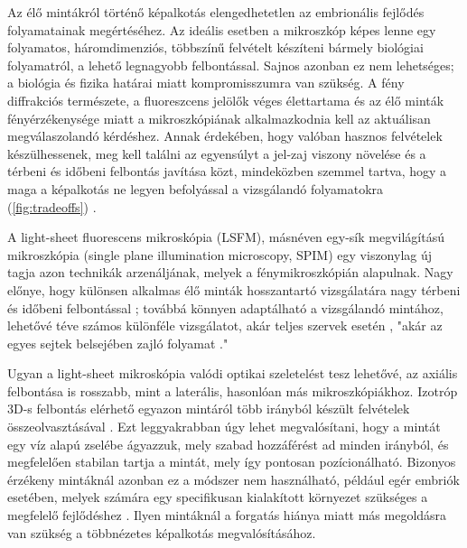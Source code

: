 \documentclass{booklet_style}
\begin{document}
Az élő mintákról történő képalkotás elengedhetetlen az embrionális fejlődés folyamatainak megértéséhez. Az ideális esetben a mikroszkóp képes lenne egy folyamatos, háromdimenziós, többszínű felvételt készíteni bármely biológiai folyamatról, a lehető legnagyobb felbontással. Sajnos azonban ez nem lehetséges; a biológia és fizika határai miatt kompromisszumra van szükség. A fény diffrakciós természete, a fluoreszcens jelölők véges élettartama és az élő minták fényérzékenysége miatt a mikroszkópiának alkalmazkodnia kell az aktuálisan megválaszolandó kérdéshez. Annak érdekében, hogy valóban hasznos felvételek készülhessenek, meg kell találni az egyensúlyt a jel-zaj viszony növelése és a térbeni és időbeni felbontás javítása közt, mindeközben szemmel tartva, hogy a maga a képalkotás ne legyen befolyással a vizsgálandó folyamatokra (\autoref{fig:tradeoffs}) \cite{laissue_assessing_2017}.

A light-sheet fluorescens mikroskópia (LSFM), másnéven egy-sík megvilágítású mikroszkópia (single plane illumination microscopy, SPIM) \cite{huisken_optical_2004} egy viszonylag új tagja azon technikák arzenáljának, melyek a fénymikroszkópián alapulnak. Nagy előnye, hogy különsen alkalmas élő minták hosszantartó vizsgálatára nagy térbeni és időbeni felbontással \cite{keller_quantitative_2008, huisken_selective_2009, weber_light_2011,tomer_shedding_2011}; továbbá könnyen adaptálható a vizsgálandó mintához, lehetővé téve számos különféle vizsgálatot, akár teljes szervek esetén \cite{dodt_ultramicroscopy:_2007}, "akár az egyes sejtek belsejében zajló folyamat \cite{chen_lattice_2014}."

Ugyan a light-sheet mikroskópia valódi optikai szeletelést tesz lehetővé, az axiális felbontása is rosszabb, mint a laterális, hasonlóan más mikroszkópiákhoz.
Izotróp 3D-s felbontás elérhető egyazon mintáról több irányból készült felvételek összeolvasztásával \cite{preibisch_efficient_2014}. Ezt leggyakrabban úgy lehet megvalósítani, hogy a mintát egy víz alapú zselébe ágyazzuk, mely szabad hozzáférést ad minden irányból, és megfelelően stabilan tartja a mintát, mely így pontosan pozícionálható. Bizonyos érzékeny mintáknál azonban ez a módszer nem használható, például egér embriók esetében, melyek számára egy specifikusan kialakított környezet szükséges a megfelelő fejlődéshez \cite{doherty_culture_2000}. Ilyen mintáknál a forgatás hiánya miatt más megoldásra van szükség a többnézetes képalkotás megvalósításához.
\end{document}
